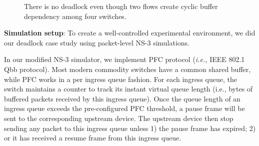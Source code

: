 \begin{figure}[t]
\vspace{-0.15in}
\caption{There is no deadlock even though two flows create cyclic buffer dependency among four switches.}
\label{fig:case1}
\vspace{-0.15in}
\end{figure}

 \textbf{Simulation setup}: To create a well-controlled experimental environment, 
 we did our deadlock case study using packet-level NS-3 simulations. 
 
 In our modified NS-3 simulator, we implement PFC protocol ({\em i.e.,} IEEE 802.1 Qbb protocol). 
 Most modern commodity switches have a common shared buffer, while PFC works in a per ingress 
 queue fashion. For each ingress queue, the switch maintains a counter to 
 track its instant virtual queue length (i.e., bytes of buffered packets received by this 
 ingress queue). Once the queue length of an ingress queue exceeds the pre-configured PFC 
 threshold, a pause frame will be sent to the corresponding upstream device. The upstream 
 device then stop sending any packet to this ingress queue unless 1) the pause frame has 
 expired; 2) or it has received a resume frame from this ingress queue.


